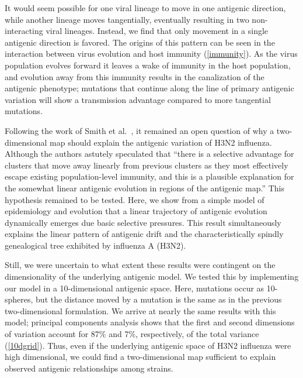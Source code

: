 It would seem possible for one viral lineage to move in one antigenic direction, while another lineage moves tangentially, eventually resulting in two non-interacting viral lineages.  Instead, we find that only movement in a single antigenic direction is favored.  The origins of this pattern can be seen in the interaction between virus evolution and host immunity (\ref{immunity}).  As the virus population evolves forward it leaves a wake of immunity in the host population, and evolution away from this immunity results in the canalization of the antigenic phenotype; mutations that continue along the line of primary antigenic variation will show a transmission advantage compared to more tangential mutations.  

Following the work of Smith et al.\ \cite{Smith04}, it remained an open question of why a two-dimensional map should explain the antigenic variation of H3N2 influenza.  Although the authors astutely speculated that ``there is a selective advantage for clusters that move away linearly from previous clusters as they most effectively escape existing population-level immunity, and this is a plausible explanation for the somewhat linear antigenic evolution in regions of the antigenic map.''  This hypothesis remained to be tested.  Here, we show from a simple model of epidemiology and evolution that a linear trajectory of antigenic evolution dynamically emerges due basic selective pressures.  This result simultaneously explains the linear pattern of antigenic drift \cite{Smith04} and the characteristically spindly genealogical tree \cite{Fitch97} exhibited by influenza A (H3N2).

Still, we were uncertain to what extent these results were contingent on the dimensionality of the underlying antigenic model.  We tested this by implementing our model in a 10-dimensional antigenic space.  Here, mutations occur as 10-spheres, but the distance moved by a mutation is the same as in the previous two-dimensional formulation.  We arrive at nearly the same results with this model; principal components analysis shows that the first and second dimensions of variation account for 87\% and 7\%, respectively, of the total variance (\ref{10dgrid}).  Thus, even if the underlying antigenic space of H3N2 influenza were high dimensional, we could find a two-dimensional map sufficient to explain observed antigenic relationships among strains.

